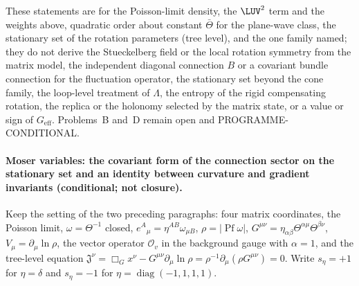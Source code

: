 These statements are for the Poisson-limit density, the \(\LUV^2\) term and the weights above, quadratic order about constant \(\bar\Theta\) for the plane-wave class, the stationary set of the rotation parameters (tree level), and the one family named; they do not derive the Stueckelberg field or the local rotation symmetry from the matrix model, the independent diagonal connection \(B\) or a covariant bundle connection for the fluctuation operator, the stationary set beyond the cone family, the loop-level treatment of \(\Lambda\), the entropy of the rigid compensating rotation, the replica or the holonomy selected by the matrix state, or a value or sign of \(G_{\mathrm{eff}}\). Problems~B and~D remain open and PROGRAMME-CONDITIONAL.

\paragraph{Moser variables: the covariant form of the connection sector on the stationary set and an identity between curvature and gradient invariants (conditional; not closure).}
Keep the setting of the two preceding paragraphs: four matrix coordinates, the Poisson limit, \(\omega=\Theta^{-1}\) closed, \(e^A{}_\mu=\eta^{AB}\omega_{\mu B}\), \(\rho=\lvert\operatorname{Pf}\omega\rvert\), \(G^{\mu\nu}=\eta_{\alpha\beta}\Theta^{\alpha\mu}\Theta^{\beta\nu}\), \(V_\mu=\partial_\mu\ln\rho\), the vector operator \(\mathcal O_v\) in the background gauge with \(\alpha=1\), and the tree-level equation \(\mathfrak J^\nu=\Box_Gx^\nu-G^{\mu\nu}\partial_\mu\ln\rho=\rho^{-1}\partial_\mu(\rho G^{\mu\nu})=0\). Write \(s_\eta=+1\) for \(\eta=\delta\) and \(s_\eta=-1\) for \(\eta=\operatorname{diag}(-1,1,1,1)\).

